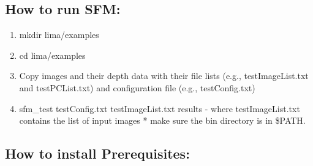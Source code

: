 \documentclass[12pt]{article}
\begin{document}
\subsection{How to run SFM:}
\begin{enumerate}
	\item{mkdir lima/examples}
	\item{cd lima/examples}
	\item{Copy images and their depth data with their file lists (e.g., testImageList.txt and testPCList.txt) and configuration file (e.g., testConfig.txt)}
	\item{sfm\_test testConfig.txt testImageList.txt results} - where testImageList.txt contains the list of input images
	* make sure the bin directory is in \$PATH.
\end{enumerate}

\subsection{How to install Prerequisites:}\label{sec:How to install Prerequisites}
\end{document}
